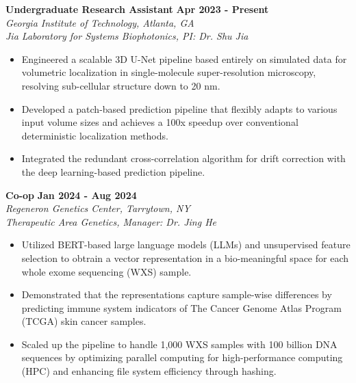\documentclass[letterpaper, 11pt]{article}
\newcommand{\subsectionvspace}{\vspace{6pt}}
\begin{document}
    \subsectionvspace

    \textbf{Undergraduate Research Assistant} \hfill 
    \textbf{Apr 2023 - Present} \\
    \textit{Georgia Institute of Technology, Atlanta, GA} \\
    \textit{Jia Laboratory for Systems Biophotonics, PI: Dr. Shu Jia}
    \begin{itemize}
        \item Engineered a scalable 3D U-Net pipeline based entirely on simulated data for volumetric localization in single-molecule super-resolution microscopy, resolving sub-cellular structure down to 20 nm.
        \item Developed a patch-based prediction pipeline that flexibly adapts to various input volume sizes and achieves a 100x speedup over conventional deterministic localization methods.
        \item Integrated the redundant cross-correlation algorithm for drift correction with the deep learning-based prediction pipeline.
    \end{itemize}

    \subsectionvspace

    \textbf{Co-op} \hfill 
    \textbf{Jan 2024 - Aug 2024} \\
    \textit{Regeneron Genetics Center, Tarrytown, NY} \\
    \textit{Therapeutic Area Genetics, Manager: Dr. Jing He}
    \begin{itemize}
        \item Utilized BERT-based large language models (LLMs) and unsupervised feature selection to obtrain a vector representation in a bio-meaningful space for each whole exome sequencing (WXS) sample.
        \item Demonstrated that the representations capture sample-wise differences by predicting immune system indicators of The Cancer Genome Atlas Program (TCGA) skin cancer samples.
        \item Scaled up the pipeline to handle 1,000 WXS samples with 100 billion DNA sequences by optimizing parallel computing for high-performance computing (HPC) and enhancing file system efficiency through hashing.
    \end{itemize}

    \subsectionvspace
\end{document}
